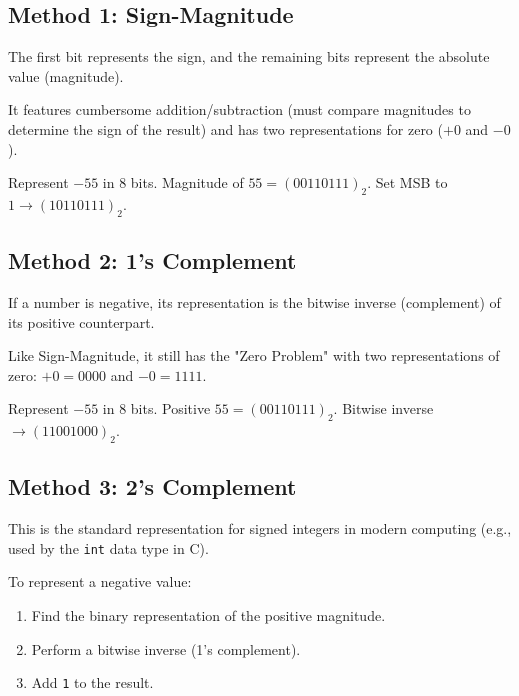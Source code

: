 \subsection{Method 1: Sign-Magnitude}

The first bit represents the sign, and the remaining bits represent the absolute value (magnitude).

\begin{remark}
It features cumbersome addition/subtraction (must compare magnitudes to determine the sign of the result) and has two representations for zero ($+0$ and $-0$).
\end{remark}

\begin{example}
Represent $-55$ in 8 bits. Magnitude of $55 = (0011 0111)_2$. Set MSB to $1 \rightarrow (1011 0111)_2$.
\end{example}

\subsection{Method 2: 1's Complement}

If a number is negative, its representation is the bitwise inverse (complement) of its positive counterpart.

\begin{remark}
Like Sign-Magnitude, it still has the "Zero Problem" with two representations of zero: $+0 = 0000$ and $-0 = 1111$.
\end{remark}

\begin{example}[1's Complement]
Represent $-55$ in 8 bits. Positive $55 = (0011 0111)_2$. Bitwise inverse $\rightarrow (1100 1000)_2$.
\end{example}

\subsection{Method 3: 2's Complement}

This is the standard representation for signed integers in modern computing (e.g., used by the \texttt{int} data type in C).

To represent a negative value:

\begin{enumerate}
    \item Find the binary representation of the positive magnitude.
    \item Perform a bitwise inverse (1's complement).
    \item Add \texttt{1} to the result.
\end{enumerate}

